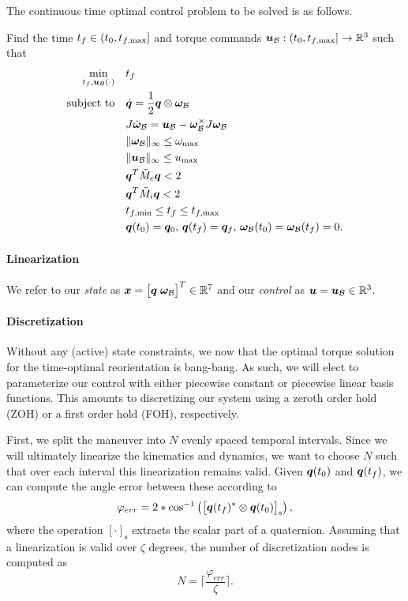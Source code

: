 \documentclass[12pt]{article}
\begin{document}
The continuous time optimal control problem to be solved is as follows. 
\begin{problem}\label{prob:prob1}
Find the time $t_f\in(t_0,t_{f,\max}]$ and torque commands $\bm{u}_{\mathcal{B}} : (t_0,t_{f,\max}] \rightarrow {\mathbb{R}}^3$ such that
\begin{subequations}
\begin{align}
\min_{t_f,\bm{u}_{\mathcal{B}}(\cdot)} &\quad t_f \\
\text{subject to} &\quad \dot{\bm{q}} = \frac{1}{2} \bm{q} \otimes \bm{\omega}_{\mathcal{B}}\\
&\quad J \dot{\bm{\omega}}_{\mathcal{B}} = \bm{u}_{\mathcal{B}} - \bm{\omega}_{\mathcal{B}}^{\times} J \bm{\omega}_{\mathcal{B}} \\
&\quad \| \bm{\omega}_{\mathcal{B}} \|_{\infty} \leq \omega_{\max} \\
&\quad \| \bm{u}_{\mathcal{B}} \|_{\infty} \leq u_{\max} \\
&\quad \bm{q}^T \tilde{M}_e \bm{q} < 2 \\
&\quad \bm{q}^T \tilde{M}_i \bm{q} < 2 \\
&\quad t_{f,\min} \leq t_f \leq t_{f,\max} \\
&\quad \bm{q}(t_0) = \bm{q}_0,\, \bm{q}(t_f) = \bm{q}_f,\,\bm{\omega}_{\mathcal{B}}(t_0) = \bm{\omega}_{\mathcal{B}}(t_f) = 0.
\end{align}
\end{subequations}
\end{problem} 

\paragraph{Linearization}
We refer to our \textit{state} as $\bm{x} = \big[ \bm{q} \; \bm{\omega}_{\mathcal{B}} \big]^T \in {\mathbb{R}}^7$ and our \textit{control} as $\bm{u} = \bm{u}_{\mathcal{B}} \in {\mathbb{R}}^3$. 


\paragraph{Discretization}

Without any (active) state constraints, we now that the optimal torque solution for the time-optimal reorientation is bang-bang. As such, we will elect to parameterize our control with either piecewise constant or piecewise linear basis functions. This amounts to discretizing our system using a zeroth order hold (ZOH) or a first order hold (FOH), respectively. 

First, we split the maneuver into $N$ evenly spaced temporal intervals. Since we will ultimately linearize the kinematics and dynamics, we want to choose $N$ such that over each interval this linearization remains valid. Given $\bm{q}(t_0)$ and $\bm{q}(t_f)$, we can compute the angle error between these according to
\begin{equation}
\varphi_{err} = 2*\cos^{-1} \left( \big[ \bm{q}(t_f)^* \otimes \bm{q}(t_0) \big]_{\text{s}} \right),
\label{eq:err_angle}
\end{equation}
where the operation $[\cdot]_{\text{s}}$ extracts the scalar part of a quaternion. Assuming that a linearization is valid over $\zeta$ degrees, the number of discretization nodes is computed as 
\begin{equation}
N = \lceil \frac{\varphi_{err}}{\zeta} \rceil.
\label{eq:N}
\end{equation}
\end{document}
